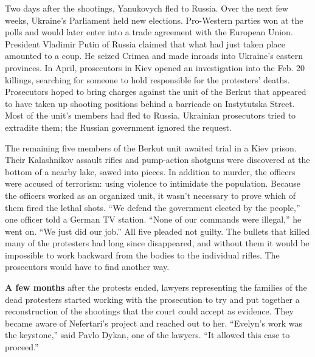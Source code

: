 Two days after the shootings, Yanukovych fled to Russia. Over the next
few weeks, Ukraine's Parliament held new elections. Pro-Western parties
won at the polls and would later enter into a trade agreement with the
European Union. President Vladimir Putin of Russia claimed that what had
just taken place amounted to a coup. He seized Crimea and made inroads
into Ukraine's eastern provinces. In April, prosecutors in Kiev opened
an investigation into the Feb. 20 killings, searching for someone to
hold responsible for the protesters' deaths. Prosecutors hoped to bring
charges against the unit of the Berkut that appeared to have taken up
shooting positions behind a barricade on Instytutska Street. Most of the
unit's members had fled to Russia. Ukrainian prosecutors tried to
extradite them; the Russian government ignored the request.

The remaining five members of the Berkut unit awaited trial in a Kiev
prison. Their Kalashnikov assault rifles and pump-action shotguns were
discovered at the bottom of a nearby lake, sawed into pieces. In
addition to murder, the officers were accused of terrorism: using
violence to intimidate the population. Because the officers worked as an
organized unit, it wasn't necessary to prove which of them fired the
lethal shots. ``We defend the government elected by the people,'' one
officer told a German TV station. ``None of our commands were illegal,''
he went on. ``We just did our job.'' All five pleaded not guilty. The
bullets that killed many of the protesters had long since disappeared,
and without them it would be impossible to work backward from the bodies
to the individual rifles. The prosecutors would have to find another
way.

\textbf{A few months} after the protests ended, lawyers representing the
families of the dead protesters started working with the prosecution to
try and put together a reconstruction of the shootings that the court
could accept as evidence. They became aware of Nefertari's project and
reached out to her. ``Evelyn's work was the keystone,'' said Pavlo
Dykan, one of the lawyers. ``It allowed this case to proceed.''

